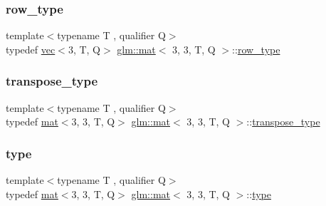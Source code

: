 \subsubsection{\texorpdfstring{row\+\_\+type}{row\_type}}
{\footnotesize\ttfamily template$<$typename T , qualifier Q$>$ \\
typedef \mbox{\hyperlink{structglm_1_1vec}{vec}}$<$3, T, Q$>$ \mbox{\hyperlink{structglm_1_1mat}{glm\+::mat}}$<$ 3, 3, T, Q $>$\+::\mbox{\hyperlink{structglm_1_1mat_3_013_00_013_00_01_t_00_01_q_01_4_aa7593e64ea44bcccb91580e6f6a45110}{row\+\_\+type}}}

\mbox{\label{structglm_1_1mat_3_013_00_013_00_01_t_00_01_q_01_4_a4ad9d88cb078cca298550c57bad63c21}} 
\subsubsection{\texorpdfstring{transpose\+\_\+type}{transpose\_type}}
{\footnotesize\ttfamily template$<$typename T , qualifier Q$>$ \\
typedef \mbox{\hyperlink{structglm_1_1mat}{mat}}$<$3, 3, T, Q$>$ \mbox{\hyperlink{structglm_1_1mat}{glm\+::mat}}$<$ 3, 3, T, Q $>$\+::\mbox{\hyperlink{structglm_1_1mat_3_013_00_013_00_01_t_00_01_q_01_4_a4ad9d88cb078cca298550c57bad63c21}{transpose\+\_\+type}}}

\mbox{\label{structglm_1_1mat_3_013_00_013_00_01_t_00_01_q_01_4_a2e88f5a6401ca62e81b61443f0148ff0}} 
\subsubsection{\texorpdfstring{type}{type}}
{\footnotesize\ttfamily template$<$typename T , qualifier Q$>$ \\
typedef \mbox{\hyperlink{structglm_1_1mat}{mat}}$<$3, 3, T, Q$>$ \mbox{\hyperlink{structglm_1_1mat}{glm\+::mat}}$<$ 3, 3, T, Q $>$\+::\mbox{\hyperlink{structglm_1_1mat_3_013_00_013_00_01_t_00_01_q_01_4_a2e88f5a6401ca62e81b61443f0148ff0}{type}}}


